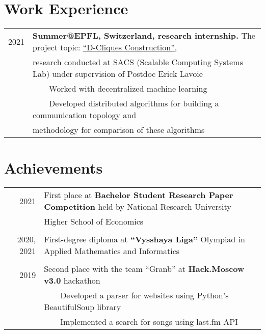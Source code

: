 \documentclass[a4paper,10pt]{article}
\newcommand{\tabitem}{~~\llap{\textbullet}~~}
\begin{document}
\section{Work Experience}
\begin{tabular}{rl}
\hspace{0.9cm} 2021 & \textbf{Summer@EPFL, Switzerland, research internship.} The project topic: \href{https://www.epfl.ch/labs/sacs/completed-student-projects/}{``D-Cliques Construction''}, \\
& research conducted at SACS (Scalable Computing Systems Lab) under supervision of Postdoc Erick Lavoie\\
& \tabitem Worked with decentralized machine learning \\
& \tabitem Developed distributed algorithms for building a communication topology and\\
& methodology for comparison of these algorithms\\
\end{tabular}

\section{Achievements}
\begin{tabular}{rl}
\hspace{0.9cm} 2021 & First place at \textbf{Bachelor Student Research Paper Competition} held by National Research University \\
&Higher School of Economics \\
&\\
2020, 2021 & First-degree diploma at \textbf{``Vysshaya Liga''} Olympiad in Applied Mathematics and Informatics \\
&\\
\hspace{0.9cm} 2019 & Second place with the team “Granb” at \textbf{Hack.Moscow v3.0} hackathon \\
& \tabitem Developed a parser for websites using Python's BeautifulSoup library \\
& \tabitem Implemented a search for songs using last.fm API \\
\end{tabular}
\end{document}
